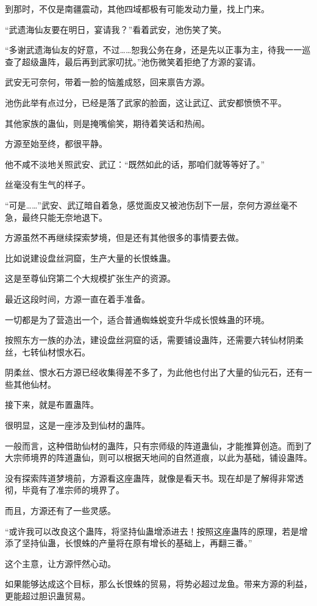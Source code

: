 \begin{this_body}
到那时，不仅是南疆震动，其他四域都极有可能发动力量，找上门来。

“武遗海仙友要在明日，宴请我？”看着武安，池伤笑了笑。

“多谢武遗海仙友的好意，不过……恕我公务在身，还是先以正事为主，待我一一巡查了超级蛊阵，最后再到武家叨扰。”池伤微笑着拒绝了方源的宴请。

武安无可奈何，带着一脸的恼羞成怒，回来禀告方源。

池伤此举有点过分，已经是落了武家的脸面，这让武辽、武安都愤愤不平。

其他家族的蛊仙，则是掩嘴偷笑，期待着笑话和热闹。

方源至始至终，都很平静。

他不咸不淡地关照武安、武辽：“既然如此的话，那咱们就等等好了。”

丝毫没有生气的样子。

“可是……”武安、武辽暗自着急，感觉面皮又被池伤刮下一层，奈何方源丝毫不急，最终只能无奈地退下。

方源虽然不再继续探索梦境，但是还有其他很多的事情要去做。

比如说建设盘丝洞窟，生产大量的长恨蛛蛊。

这是至尊仙窍第二个大规模扩张生产的资源。

最近这段时间，方源一直在着手准备。

一切都是为了营造出一个，适合普通蜘蛛蜕变升华成长恨蛛蛊的环境。

按照东方一族的办法，建设盘丝洞窟的话，需要铺设蛊阵，还需要六转仙材阴柔丝，七转仙材恨水石。

阴柔丝、恨水石方源已经收集得差不多了，为此他也付出了大量的仙元石，还有一些其他仙材。

接下来，就是布置蛊阵。

很明显，这是一座涉及到仙材的蛊阵。

一般而言，这种借助仙材的蛊阵，只有宗师级的阵道蛊仙，才能推算创造。而到了大宗师境界的阵道蛊仙，则可以根据天地间的自然道痕，以此为基础，铺设蛊阵。

没有探索阵道梦境前，方源看这座蛊阵，就像是看天书。现在却是了解得非常透彻，毕竟有了准宗师的境界了。

而且，方源还有了一些灵感。

“或许我可以改良这个蛊阵，将坚持仙蛊增添进去！按照这座蛊阵的原理，若是增添了坚持仙蛊，长恨蛛的产量将在原有增长的基础上，再翻三番。”

这个主意，让方源怦然心动。

如果能够达成这个目标，那么长恨蛛的贸易，将势必超过龙鱼。带来方源的利益，更能超过胆识蛊贸易。


\end{this_body}
